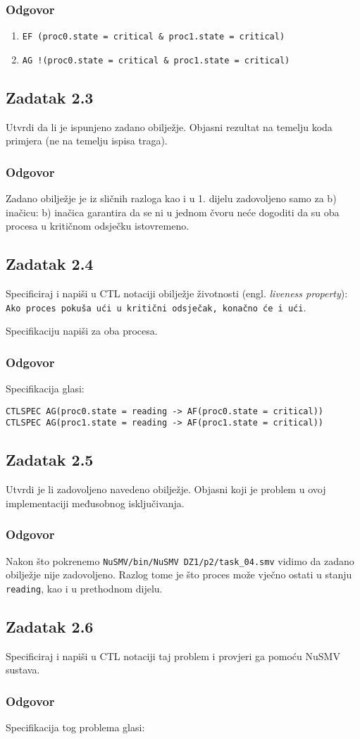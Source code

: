 \documentclass{article}
\newcommand{\code}[1]{\colorbox{blue!15}{\texttt{#1}}}
\newcommand{\odgovor}{\subsubsection*{Odgovor}}
\newcommand{\zadatak}[1]{\subsection{Zadatak #1}}
\begin{document}
\odgovor

\begin{enumerate}[label=\alph*)]
\item \code{EF (proc0.state = critical \& proc1.state = critical)}
\item \code{AG !(proc0.state = critical \& proc1.state = critical)}
\end{enumerate}


\zadatak{2.3}

Utvrdi da li je ispunjeno zadano obilježje. Objasni rezultat na temelju koda primjera (ne na temelju ispisa traga).

\odgovor

Zadano obilježje je iz sličnih razloga kao i u 1. dijelu zadovoljeno samo za b) inačicu: b) inačica garantira da se ni u jednom čvoru neće dogoditi da su oba procesa u kritičnom odsječku istovremeno.


\zadatak{2.4}

Specificiraj i napiši u CTL notaciji obilježje životnosti (engl. \textit{liveness property}):\newline
\code{Ako proces pokuša ući u kritični odsječak, konačno će i ući}.
\newline

\noindent
Specifikaciju napiši za oba procesa. 

\odgovor

Specifikacija glasi:

\begin{verbatim}
CTLSPEC AG(proc0.state = reading -> AF(proc0.state = critical))
CTLSPEC AG(proc1.state = reading -> AF(proc1.state = critical))
\end{verbatim}
\pagebreak  %


\zadatak{2.5}

 Utvrdi je li zadovoljeno navedeno obilježje. Objasni koji je problem u ovoj implementaciji međusobnog isključivanja.
 
\odgovor

Nakon što pokrenemo \code{NuSMV/bin/NuSMV DZ1/p2/task\_04.smv} vidimo da zadano obilježje nije zadovoljeno. Razlog tome je što proces može vječno ostati u stanju \code{reading}, kao i u prethodnom dijelu.
 
 
\zadatak{2.6}

Specificiraj i napiši u CTL notaciji taj problem i provjeri ga pomoću NuSMV sustava.

\odgovor

Specifikacija tog problema glasi:
\end{document}
